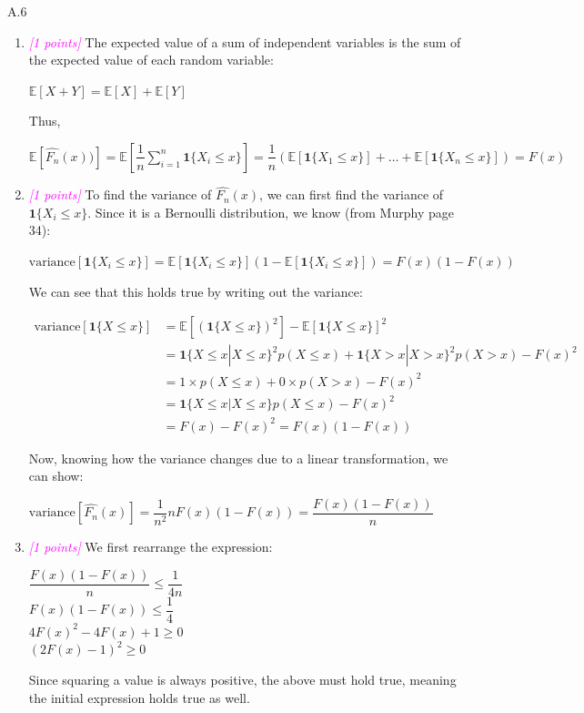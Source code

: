 \documentclass{article}
\newcommand{\1}{\mathbf{1}}
\newcommand{\E}{\mathbb{E}}
\newcommand{\points}[1]{\small\textcolor{magenta}{\emph{[#1 points]}} \normalsize}
\begin{document}
A.6 
  \begin{enumerate}
  \item \points{1} The expected value of a sum of independent variables is the sum of the expected value of each random variable:
  \begin{center}
  	$\E[X+Y]=\E[X]+\E[Y]$
  \end{center}
  Thus, 
  \begin{center}
  	$\E[\hat{F_n}(x))]=\E\left [\dfrac{1}{n}\sum_{i=1}^{n}\1\{X_i\leq x\}\right ]=\dfrac{1}{n}(\E[\1\{X_1\leq x\}]+\dots+\E[\1\{X_n\leq x\}])=F(x)$
  \end{center}
  
  \item \points{1} To find the variance of $\hat{F_n}(x)$, we can first find the variance of $\1\{X_i\leq x\}$. Since it is a Bernoulli distribution, we know (from Murphy page 34):
    \begin{center}
	  	$\text{variance}[\1\{X_i\leq x\}]=\E[\1\{X_i\leq x\}](1-\E[\1\{X_i\leq x\}])=F(x)(1-F(x))$
    \end{center}
  
  	We can see that this holds true by writing out the variance:
  	\begin{center}
  		$\begin{aligned}\text{variance}[\1\{X\leq x\}]&=\E[(\1\{X\leq x\})^2]-\E[\1\{X\leq x\}]^2\\
  		&= \1\{X\leq x|X\leq x\}^2p(X\leq x) + \1\{X> x|X> x\}^2p(X> x)-F(x)^2 \\
  		&= 1\times p(X\leq x) + 0\times p(X> x)-F(x)^2\\
  		&= \1\{X\leq x|X\leq x\}p(X\leq x) -F(x)^2 \\
  		&= F(x)-F(x)^2 = F(x)(1-F(x))\end{aligned}$
    \end{center}
	Now, knowing how the variance changes due to a linear transformation, we can show:
	\begin{center}
		$\text{variance}[\hat{F_n}(x)]= \dfrac{1}{n^2} n F(x)(1-F(x))  = \dfrac{F(x)(1-F(x))}{n}$
	\end{center}
  
  \item \points{1} We first rearrange the expression:
    \begin{center}
      $\dfrac{F(x)(1-F(x))}{n} \leq \dfrac{1}{4n}$\\
      $F(x)(1-F(x)) \leq \dfrac{1}{4}$\\
      $4F(x)^2-4F(x)+1\geq0$\\
      $(2F(x)-1)^2\geq0$
    \end{center}
	Since squaring a value is always positive, the above must hold true, meaning the initial expression holds true as well.
  \end{enumerate} 
\end{document}
